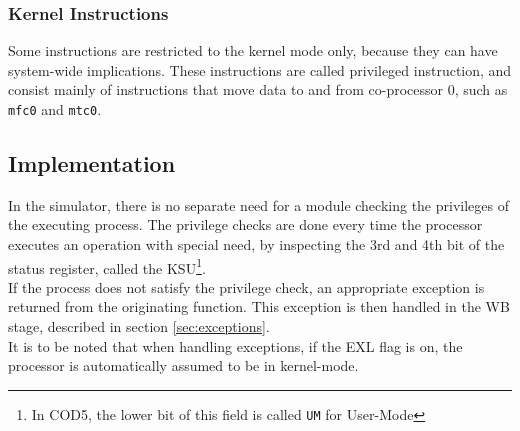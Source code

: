 \subsubsection{Kernel Instructions}
Some instructions are restricted to the kernel mode only, because they can have
system-wide implications. These instructions are called privileged
instruction, and consist mainly of instructions that move data to and from
co-processor 0, such as \texttt{mfc0} and \texttt{mtc0}.


\subsection{Implementation}
In the simulator, there is no separate need for a module checking the
privileges of the executing process. The privilege checks are done every time
the processor executes an operation with special need, by inspecting the 3rd
and 4th bit of the status register, called the KSU\footnote{In COD5, the lower
bit of this field is called \texttt{UM} for User-Mode\cite{COD5}}.\\
If the process does not satisfy the privilege check, an appropriate exception
is returned from the originating function. This exception is then handled in the WB
stage, described in section \ref{sec:exceptions}.\\
It is to be noted that when handling exceptions, if the EXL flag is on, the
processor is automatically assumed to be in kernel-mode\cite{see_mips_run}.
